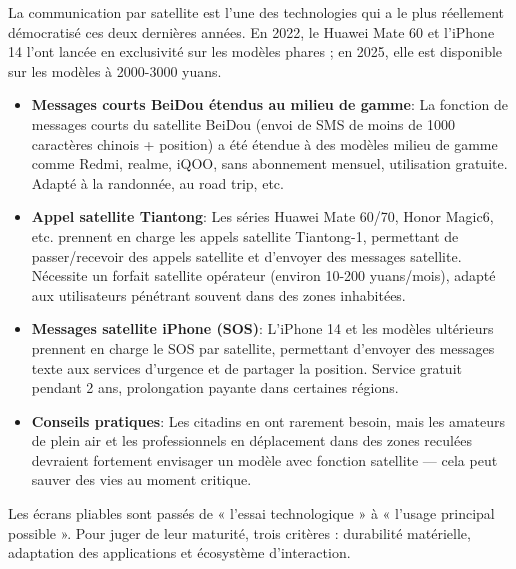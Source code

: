 
La communication par satellite est l'une des technologies qui a le plus réellement démocratisé ces deux dernières années. En 2022, le Huawei Mate 60 et l'iPhone 14 l'ont lancée en exclusivité sur les modèles phares ; en 2025, elle est disponible sur les modèles à 2000-3000 yuans.

\begin{itemize}
  \item \textbf{Messages courts BeiDou étendus au milieu de gamme}: La fonction de messages courts du satellite BeiDou (envoi de SMS de moins de 1000 caractères chinois + position) a été étendue à des modèles milieu de gamme comme Redmi, realme, iQOO, sans abonnement mensuel, utilisation gratuite. Adapté à la randonnée, au road trip, etc.
  \item \textbf{Appel satellite Tiantong}: Les séries Huawei Mate 60/70, Honor Magic6, etc. prennent en charge les appels satellite Tiantong-1, permettant de passer/recevoir des appels satellite et d'envoyer des messages satellite. Nécessite un forfait satellite opérateur (environ 10-200 yuans/mois), adapté aux utilisateurs pénétrant souvent dans des zones inhabitées.
  \item \textbf{Messages satellite iPhone (SOS)}: L'iPhone 14 et les modèles ultérieurs prennent en charge le SOS par satellite, permettant d'envoyer des messages texte aux services d'urgence et de partager la position. Service gratuit pendant 2 ans, prolongation payante dans certaines régions.
  \item \textbf{Conseils pratiques}: Les citadins en ont rarement besoin, mais les amateurs de plein air et les professionnels en déplacement dans des zones reculées devraient fortement envisager un modèle avec fonction satellite — cela peut sauver des vies au moment critique.
\end{itemize}


Les écrans pliables sont passés de « l'essai technologique » à « l'usage principal possible ». Pour juger de leur maturité, trois critères : durabilité matérielle, adaptation des applications et écosystème d'interaction.

